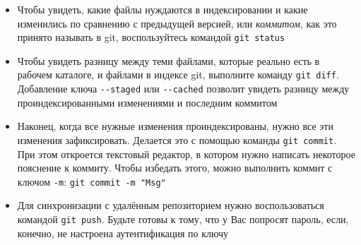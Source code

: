 \documentclass{beamer}
\begin{document}
\begin{frame}
	\begin{itemize}
		\item{Чтобы увидеть, какие файлы нуждаются в индексировании и какие изменились по сравнению с предыдущей версией, или \emph{коммитом}, как это принято называть в git, воспользуйтесь командой \texttt{git status}}\pause
		\item{Чтобы увидеть разницу между теми файлами, которые реально есть в рабочем каталоге, и файлами в индексе git, выполните команду \texttt{git diff}. Добавление ключа \texttt{-{}-staged} или \texttt{-{}-cached} позволит увидеть разницу между проиндексированными изменениями и последним коммитом}\pause
		\item{Наконец, когда все нужные изменения проиндексированы, нужно все эти изменения зафиксировать. Делается это с помощью команды \texttt{git commit}. При этом откроется текстовый редактор, в котором нужно написать некоторое пояснение к коммиту. Чтобы избедать этого, можно выполнить коммит с ключом \texttt{-m}: \texttt{git commit -m "Msg"}}
	\end{itemize}
\end{frame}

\begin{frame}
	\begin{itemize}
		\item{Для синхронизации с удалённым репозиторием нужно воспользоваться командой \texttt{git push}. Будьте готовы к тому, что у Вас попросят пароль, если, конечно, не настроена аутентификация по ключу}\pause
		
	\end{itemize}
\end{frame}
\end{document}
